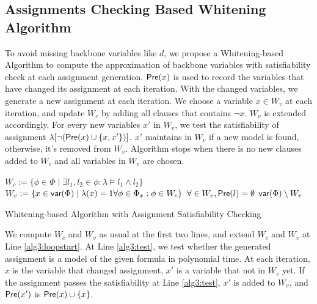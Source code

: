 \medskip

\subsection{Assignments Checking Based Whitening Algorithm}

To avoid missing backbone variables like $d$, we propose a Whitening-based Algorithm to compute the approximation of backbone variables with satisfiability check at each assignment generation. $\textsf{Pre}(x)$ is used to record the variables that have changed its assignment at each iteration. With the changed variables, we generate a new assignment at each iteration. We choose a variable $x\in W_v$ at each iteration, and update $W_c$ by adding all clauses that contains $\neg x$. $W_v$ is extended accordingly. For every new variables $x'$ in $W_v$, we test the satisfiability of assignment $\lambda[\neg (\textsf{Pre}(x)\cup\{x,x'\})]$. $x'$ maintains in $W_v$ if a new model is found, otherwise, it's removed from $W_v$. Algorithm stops when there is no new clauses added to $W_c$ and all variables in $W_v$ are chosen.


\begin{algorithm2e}
\SetAlgoShortEnd
\SetFillComment
{}
$W_c:=\{\phi\in\Phi\mid \exists l_1,l_2\in\phi: \lambda\models l_1\wedge l_2\}$\;\label{alg3:l1}
$W_v:=\{x\in\textsf{var}(\Phi) \mid \lambda(x)=1 \forall\phi\in\Phi_x: \phi\in W_c\}$\; \label{alg3:l2}
$\forall \in W_v, \textsf{Pre}(l)=\emptyset$\;
\label{alg3:loopend}
\Return $\textsf{var}(\Phi)\setminus W_v$\;
\caption{Whitening-based Algorithm with Assignment Satisfiability Checking}
\label{alg:ewhite}
\end{algorithm2e}

We compute $W_c$ and $W_v$ as usual at the first two lines, and extend $W_c$ and $W_v$ at Line \ref{alg3:loopstart}. At Line \ref{alg3:test}, we test whether the generated assignment is a model of the given formula in polynomial time. At each iteration, $x$ is the variable that changed assignment, $x'$ is a variable that not in $W_v$ yet. If the assignment passes the satisfiability at Line \ref{alg3:test}, $x'$ is added to $W_v$, and $\textsf{Pre}(x')$ is $\textsf{Pre}(x)\cup \{x\}$.

